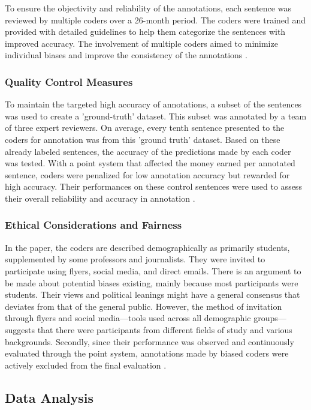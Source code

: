 To ensure the objectivity and reliability of the annotations, each sentence was reviewed by multiple coders over a 26-month period. The coders were trained and provided with detailed guidelines to help them  categorize the sentences with improved accuracy. The involvement of multiple coders aimed to minimize individual biases and improve the consistency of the annotations \cite{claimbuster_arslan}.

\subsubsection{Quality Control Measures}
To maintain the targeted high accuracy of annotations, a subset of the sentences was used to create a 'ground-truth' dataset. This subset was annotated by a team of three expert reviewers. On average, every tenth sentence presented to the coders for annotation was from this 'ground truth' dataset. Based on these already labeled sentences, the accuracy of the predictions made by each coder was tested. With a point system that affected the money earned per annotated sentence, coders were penalized for low annotation accuracy but rewarded for high accuracy. Their performances on these control sentences were used to assess their overall reliability and accuracy in annotation \cite{claimbuster_arslan}.

\subsubsection{Ethical Considerations and Fairness}

In the paper, the coders are described demographically as primarily students, supplemented by some professors and journalists. They were invited to participate using flyers, social media, and direct emails. There is an argument to be made about potential biases existing, mainly because most participants were students. Their views and political leanings might have a general consensus that deviates from that of the general public. However, the method of invitation through flyers and social media—tools used across all demographic groups—suggests that there were participants from different fields of study and various backgrounds. Secondly, since their performance was observed and continuously evaluated through the point system, annotations made by biased coders were actively excluded from the final evaluation \cite{claimbuster_arslan}.


\subsection{Data Analysis}
